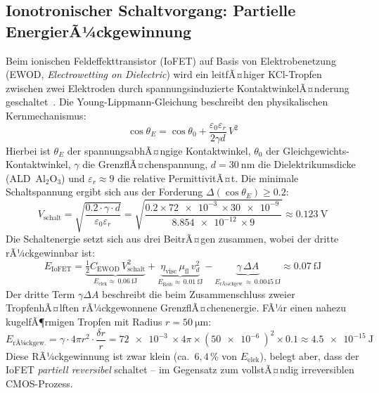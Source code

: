 ﻿\documentclass[12pt, a4paper]{report}
\theoremstyle{definition}
\theoremstyle{remark}
\begin{document}
\subsection{Ionotronischer Schaltvorgang: Partielle EnergierÃ¼ckgewinnung}

Beim ionischen Feldeffekttransistor (IoFET) auf Basis von Elektrobenetzung
(EWOD, \emph{Electrowetting on Dielectric}) wird ein leitfÃ¤higer
KCl-Tropfen zwischen zwei Elektroden durch spannungsinduzierte
KontaktwinkelÃ¤nderung geschaltet~\cite{ionotronik2026}.
Die Young-Lippmann-Gleichung beschreibt den physikalischen Kernmechanismus:
\begin{equation}
  \cos\theta_E = \cos\theta_0
  + \frac{\varepsilon_0 \varepsilon_r}{2 \gamma d}\, V^2
  \label{eq:young_lippmann_thermo}
\end{equation}
Hierbei ist $\theta_E$ der spannungsabhÃ¤ngige Kontaktwinkel, $\theta_0$
der Gleichgewichts-Kontaktwinkel, $\gamma$ die GrenzflÃ¤chenspannung,
$d = \SI{30}{\nano\metre}$ die Dielektrikumsdicke (ALD~Al$_2$O$_3$)
und $\varepsilon_r \approx 9$ die relative PermittivitÃ¤t.
Die minimale Schaltspannung ergibt sich aus der Forderung
$\Delta(\cos\theta_E) \geq 0.2$:
\begin{equation}
  V_\text{schalt}
  = \sqrt{\frac{0.2 \cdot \gamma \cdot d}{\varepsilon_0 \varepsilon_r}}
  = \sqrt{\frac{0.2 \times \SI{72e-3}{} \times \SI{30e-9}{}}%
              {\SI{8.854e-12}{} \times 9}}
  \approx \SI{0.123}{\volt}
  \label{eq:v_schalt_th}
\end{equation}
Die Schaltenergie setzt sich aus drei BeitrÃ¤gen zusammen, wobei der
dritte rÃ¼ckgewinnbar ist:
\begin{equation}
  E_\text{IoFET}
  = \underbrace{\tfrac{1}{2}C_\text{EWOD}\,V_\text{schalt}^2}_{E_\text{elek}
    \approx\,\SI{0.06}{\femto\joule}}
  + \underbrace{\eta_\text{visc}\,\mu_\text{fl}\,v_d^2}_{E_\text{Reib}
    \approx\,\SI{0.01}{\femto\joule}}
  - \underbrace{\gamma\,\Delta A}_{E_\text{rÃ¼ckgew.}
    \approx\,\SI{0.0045}{\femto\joule}}
  \approx \SI{0.07}{\femto\joule}
  \label{eq:e_iofet}
\end{equation}
Der dritte Term $\gamma \Delta A$ beschreibt die beim Zusammenschluss zweier
TropfenhÃ¤lften rÃ¼ckgewonnene GrenzflÃ¤chenenergie. FÃ¼r einen nahezu
kugelfÃ¶rmigen Tropfen mit Radius $r = \SI{50}{\micro\metre}$:
\begin{equation}
  E_\text{rÃ¼ckgew.}
  = \gamma \cdot 4\pi r^2 \cdot \frac{\delta r}{r}
  = \SI{72e-3}{} \times 4\pi \times (\SI{50e-6}{})^2 \times 0.1
  \approx \SI{4.5e-15}{\joule}
  \label{eq:e_ruckgew}
\end{equation}
Diese RÃ¼ckgewinnung ist zwar klein (ca.\ $6{,}4\,\%$ von
$E_\text{elek}$), belegt aber, dass der IoFET \emph{partiell reversibel}
schaltet -- im Gegensatz zum vollstÃ¤ndig irreversiblen CMOS-Prozess.
\end{document}

